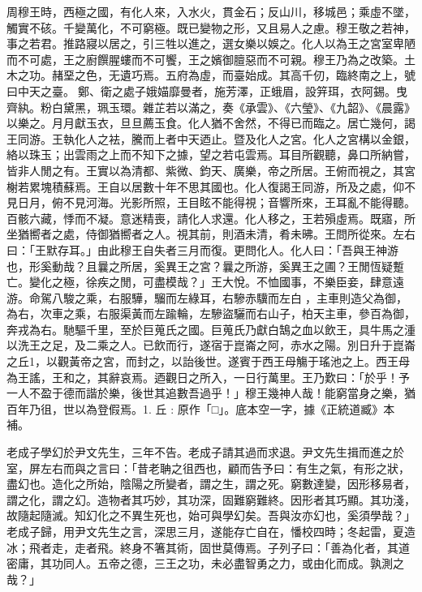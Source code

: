 
\begin{pinyinscope}
周穆王時，西極之國，有化人來，入水火，貫金石；反山川，移城邑；乘虛不墜，觸實不硋。千變萬化，不可窮極。既已變物之形，又且易人之慮。穆王敬之若神，事之若君。推路寢以居之，引三牲以進之，選女樂以娛之。化人以為王之宮室卑陋而不可處，王之廚饌腥螻而不可饗，王之嬪御膻惡而不可親。穆王乃為之改築。土木之功。赭堊之色，无遺巧焉。五府為虛，而臺始成。其高千仞，臨終南之上，號曰中天之臺。𥳑鄭、衛之處子娥媌靡曼者，施芳澤，正蛾眉，設笄珥，衣阿錫。曳齊紈。粉白黛黑，珮玉環。雜芷若以滿之，奏《承雲》、《六瑩》、《九韶》、《晨露》以樂之。月月獻玉衣，旦旦薦玉食。化人猶不舍然，不得已而臨之。居亡幾何，謁王同游。王執化人之袪，騰而上者中天迺止。暨及化人之宮。化人之宮構以金銀，絡以珠玉；出雲雨之上而不知下之據，望之若屯雲焉。耳目所觀聽，鼻口所納嘗，皆非人閒之有。王實以為清都、紫微、鈞天、廣樂，帝之所居。王俯而視之，其宮榭若累塊積蘇焉。王自以居數十年不思其國也。化人復謁王同游，所及之處，仰不見日月，俯不見河海。光影所照，王目眩不能得視；音響所來，王耳亂不能得聽。百骸六藏，悸而不凝。意迷精喪，請化人求還。化人移之，王若殞虛焉。既寤，所坐猶嚮者之處，侍御猶嚮者之人。視其前，則酒未清，肴未昲。王問所從來。左右曰：「王默存耳。」由此穆王自失者三月而復。更問化人。化人曰：「吾與王神游也，形奚動哉？且曩之所居，奚異王之宮？曩之所游，奚異王之圃？王閒恆疑蹔亡。變化之極，徐疾之閒，可盡模哉？」王大悅。不恤國事，不樂臣妾，肆意遠游。命駕八駿之乘，右服驊，騮而左綠耳，右驂赤驥而左白𣚘，主車則造父為御，𧮼𠜦為右，次車之乘，右服渠黃而左踰輪，左驂盜驪而右山子，柏天主車，參百為御，奔戎為右。馳驅千里，至於巨蒐氏之國。巨蒐氏乃獻白鵠之血以飲王，具牛馬之湩以洗王之足，及二乘之人。已飲而行，遂宿于崑崙之阿，赤水之陽。別日升于崑崙之丘1，以觀黃帝之宮，而封之，以詒後世。遂賓于西王母觴于瑤池之上。西王母為王謠，王和之，其辭哀焉。迺觀日之所入，一日行萬里。王乃歎曰：「於乎！予一人不盈于德而諧於樂，後世其追數吾過乎！」穆王幾神人哉！能窮當身之樂，猶百年乃徂，世以為登假焉。1. 丘 : 原作「□」。底本空一字，據《正統道臧》本補。

老成子學幻於尹文先生，三年不告。老成子請其過而求退。尹文先生揖而進之於室，屏左右而與之言曰：「昔老聃之徂西也，顧而告予曰：有生之氣，有形之狀，盡幻也。造化之所始，陰陽之所變者，謂之生，謂之死。窮數達變，因形移易者，謂之化，謂之幻。造物者其巧妙，其功深，固難窮難終。因形者其巧顯。其功淺，故隨起隨滅。知幻化之不異生死也，始可與學幻矣。吾與汝亦幻也，奚須學哉？」老成子歸，用尹文先生之言，深思三月，遂能存亡自在，憣校四時；冬起雷，夏造冰；飛者走，走者飛。終身不箸其術，固世莫傳焉。子列子曰：「善為化者，其道密庸，其功同人。五帝之德，三王之功，未必盡智勇之力，或由化而成。孰測之哉？」


\end{pinyinscope}
